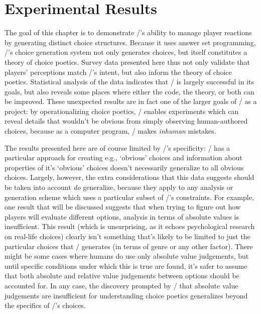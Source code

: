 \chapter{Experimental Results}

\label{ch:results}


The goal of this chapter is to demonstrate \dunyazad/'s ability to manage player reactions by generating distinct choice structures.
%
Because it uses answer set programming, \dunyazad/'s choice generation system not only generates choices, but itself constitutes a theory of choice poetics.
%
Survey data presented here thus not only validate that players' perceptions match \dunyazad/'s intent, but also inform the theory of choice poetics.
%
Statistical analysis of the data indicates that \dunyazad/ is largely successful in its goals, but also reveals some places where either the code, the theory, or both can be improved. 
%
These unexpected results are in fact one of the larger goals of \dunyazad/ as a project: by operationalizing choice poetics, \dunyazad/ enables experiments which can reveal details that wouldn't be obvious from simply observing human-authored choices, because as a computer program, \dunyazad/ makes \emph{inhuman} mistakes.


The results presented here are of course limited by \dunyazad/'s specificity: \dunyazad/ has a particular approach for creating e.g., `obvious' choices and information about properties of it's `obvious' choices doesn't necessarily generalize to all obvious choices.
%
Largely, however, the extra considerations that this data suggests should be taken into account \emph{do} generalize, because they apply to any analysis or generation scheme which uses a particular subset of \dunyazad/'s constraints.
%
For example, one result that will be discussed suggests that when trying to figure out how players will evaluate different options, analysis in terms of absolute values is insufficient.
%
This result (which is unsurprising, as it echoes psychological research on real-life choices) clearly isn't something that's likely to be limited to just the particular choices that \dunyazad/ generates (in terms of genre or any other factor).
%
There might be some cases where humans do use only absolute value judgements, but until specific conditions under which this is true are found, it's safer to assume that both absolute and relative value judgements between options should be accounted for.
%
In any case, the discovery prompted by \dunyazad/ that absolute value judgements are insufficient for understanding choice poetics generalizes beyond the specifics of \dunyazad/'s choices.



